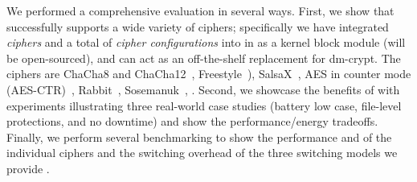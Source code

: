 We performed a comprehensive evaluation in several ways.
%
First, we show that \sys successfully supports a wide variety of ciphers;
specifically we have integrated {\em \numCiphers ciphers} and a total of {\em
\numConfigs cipher configurations} into \sys in \locTotal as a kernel block
module (will be open-sourced), and can act as an off-the-shelf replacement for
dm-crypt. The ciphers are ChaCha8 and ChaCha12~\cite{ChaCha20},
Freestyle~\cite{Freestyle}), SalsaX~\cite{SalsaX}, AES in counter mode
(AES-CTR)~\cite{AESCTR}, Rabbit~\cite{Rabbit}, Sosemanuk~\cite{Sosemanuk}, \xxx.
%
Second, we showcase the benefits of \sys with experiments illustrating three
real-world case studies (battery low case, file-level protections, and no
downtime) and show the performance/energy tradeoffs.
%
Finally, we perform several benchmarking to show the performance and \xxx of the
individual ciphers and the switching overhead of the three switching models we
provide .
